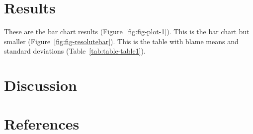 \documentclass[
  man,floatsintext]{apa6}
\newlength{\cslhangindent}
\newlength{\cslentryspacingunit} %
\newenvironment{CSLReferences}[2] %
 {%
  \setlength{\parindent}{0pt}
  \ifodd #1
  \let\oldpar\par
  \def\par{\hangindent=\cslhangindent\oldpar}
  \fi
  \setlength{\parskip}{#2\cslentryspacingunit}
 }%
 {}
\begin{document}
\hypertarget{results}{%
\section{Results}\label{results}}

These are the bar chart results (Figure~\ref{fig:fig-plot-1}). This is the bar chart but smaller (Figure~\ref{fig:fig-resolutebar}). This is the table with blame means and standard deviations (Table~\ref{tab:table-table1}).

\hypertarget{discussion}{%
\section{Discussion}\label{discussion}}

\newpage

\hypertarget{references}{%
\section{References}\label{references}}

\hypertarget{refs}{}
\begin{CSLReferences}{0}{0}
\end{CSLReferences}
\end{document}
